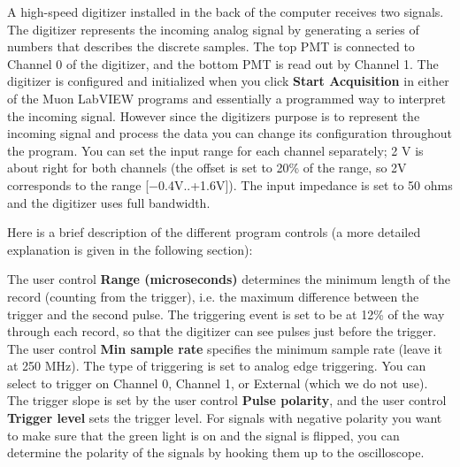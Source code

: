 \documentclass{../lab}
\begin{document}
A high-speed digitizer installed in the back of the computer receives two signals. The digitizer represents the incoming analog signal by generating a series of numbers that describes the discrete samples. The top PMT is connected to Channel 0 of the digitizer, and the bottom PMT is read out by Channel 1. The digitizer is configured and initialized when you click \textbf{Start Acquisition} in either of the Muon LabVIEW programs and essentially a programmed way to interpret the incoming signal. However since the digitizers purpose is to represent the incoming signal and process the data you can change its configuration throughout the program. You can set the input range for each channel separately; 2 V is about right for both channels (the offset is set to 20\% of the range, so 2V corresponds to the range [$-$0.4V..+1.6V]). The input impedance is set to 50 ohms and the digitizer uses full bandwidth.

Here is a brief description of the different program controls (a more detailed explanation is given in the following section):

The user control \textbf{Range (microseconds)} determines the minimum length of the record (counting from the trigger), i.e. the maximum difference between the trigger and the second pulse. The triggering event is set to be at 12\% of the way through each record, so that the digitizer can see pulses just before the trigger. The user control \textbf{Min sample rate} specifies the minimum sample rate (leave it at 250 MHz). The type of triggering is set to analog edge triggering. You can select to trigger on Channel 0, Channel 1, or External (which we do not use). The trigger slope is set by the user control \textbf{Pulse polarity}, and the user control \textbf{Trigger level} sets the trigger level. For signals with negative polarity you want to make sure that the green light is on and the signal is flipped, you can determine the polarity of the signals by hooking them up to the oscilloscope.
\end{document}
